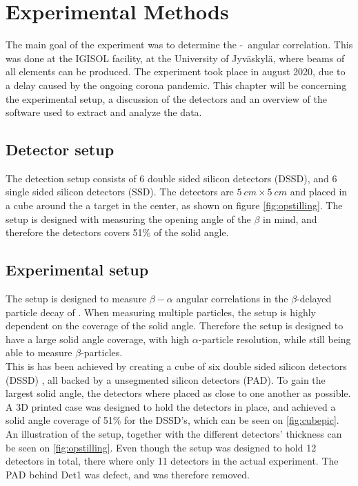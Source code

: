 \chapter{Experimental Methods}
The main goal of the experiment was to determine the \be-\al\ angular correlation. This was done at the IGISOL facility, at the University of Jyväskylä, where beams of all elements can be produced. The experiment took place in august 2020, due to a delay caused  by the ongoing corona pandemic. This chapter will be concerning the experimental setup, a discussion of the detectors and an overview of the software used to extract and analyze the data. 

\section{Detector setup}
The detection setup consists of 6 double sided silicon detectors (DSSD), and 6 single sided silicon detectors (SSD). 
The detectors are $\SI{5}{cm} \times \SI{5}{cm}$ and placed in a cube around the a target in the center, as shown on figure \cref{fig:opstilling}. The setup is designed with measuring the opening angle of the $\beta$  in mind, and therefore the detectors covers 51\% of the solid angle. \\


\section{Experimental setup}
The setup is designed to measure $\beta-\alpha$ angular correlations in the $\beta$-delayed particle decay of . When measuring multiple particles, the setup is highly dependent on the coverage of the solid angle. Therefore the setup is designed to have a large solid angle coverage, with high $\alpha$-particle resolution, while still being able to measure $\beta$-particles. \\
This is has been achieved by creating a cube of six double sided silicon detectors (DSSD) , all backed by a unsegmented silicon detectors (PAD). To gain the largest solid angle, the detectors where placed as close to one another as possible. A 3D printed case was designed to hold the detectors in place, and achieved a solid angle coverage of 51\% for the DSSD's, which can be seen on \cref{fig:cubepic}. An illustration of the setup, together with the different detectors' thickness can be seen on \cref{fig:opstilling}. 
Even though the setup was designed to hold 12 detectors in total, there where only 11 detectors in the actual experiment. The PAD behind Det1 was defect, and was therefore removed. 

